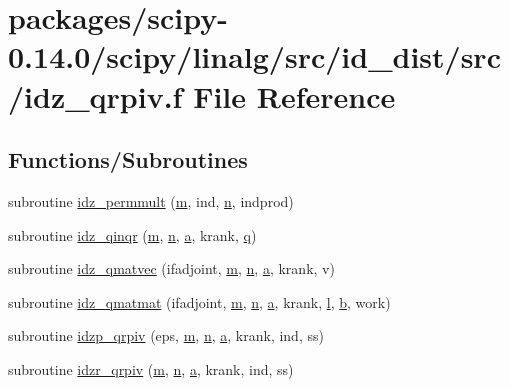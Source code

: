 \hypertarget{idz__qrpiv_8f}{}\section{packages/scipy-\/0.14.0/scipy/linalg/src/id\+\_\+dist/src/idz\+\_\+qrpiv.f File Reference}
\label{idz__qrpiv_8f}
\subsection*{Functions/\+Subroutines}
\begin{DoxyCompactItemize}
\item 
subroutine \hyperlink{idz__qrpiv_8f_ab3e300babf4872d97a265ac09734f7c9}{idz\+\_\+permmult} (\hyperlink{indexexpr_8h_ab72fdb4031d47b75ab26dd18a437bcdc}{m}, ind, \hyperlink{indexexpr_8h_ab427e2e2b4d6cec55fa088ea2a692ace}{n}, indprod)
\item 
subroutine \hyperlink{idz__qrpiv_8f_afd509302dac0cfc5ae5e46c105357ab2}{idz\+\_\+qinqr} (\hyperlink{indexexpr_8h_ab72fdb4031d47b75ab26dd18a437bcdc}{m}, \hyperlink{indexexpr_8h_ab427e2e2b4d6cec55fa088ea2a692ace}{n}, \hyperlink{gen__mat5files_8m_aae328bf20413f220e38aec4d95bfd6da}{a}, krank, \hyperlink{indexexpr_8h_ac886c3584e464b5533390d7440c9dd98}{q})
\item 
subroutine \hyperlink{idz__qrpiv_8f_a6e914f5bb035d5349d8ee04240645f92}{idz\+\_\+qmatvec} (ifadjoint, \hyperlink{indexexpr_8h_ab72fdb4031d47b75ab26dd18a437bcdc}{m}, \hyperlink{indexexpr_8h_ab427e2e2b4d6cec55fa088ea2a692ace}{n}, \hyperlink{gen__mat5files_8m_aae328bf20413f220e38aec4d95bfd6da}{a}, krank, v)
\item 
subroutine \hyperlink{idz__qrpiv_8f_a0893e88e5d3654c0e96b9329e3317bb7}{idz\+\_\+qmatmat} (ifadjoint, \hyperlink{indexexpr_8h_ab72fdb4031d47b75ab26dd18a437bcdc}{m}, \hyperlink{indexexpr_8h_ab427e2e2b4d6cec55fa088ea2a692ace}{n}, \hyperlink{gen__mat5files_8m_aae328bf20413f220e38aec4d95bfd6da}{a}, krank, \hyperlink{indexexpr_8h_a88aacdaa46b76729743ee33ef8b95a58}{l}, \hyperlink{gen__mat5files_8m_a7b38767b3b6a8dae167e5afa4fc340b0}{b}, work)
\item 
subroutine \hyperlink{idz__qrpiv_8f_aa8d5e2dd1378cb02aa99cb28ef888238}{idzp\+\_\+qrpiv} (eps, \hyperlink{indexexpr_8h_ab72fdb4031d47b75ab26dd18a437bcdc}{m}, \hyperlink{indexexpr_8h_ab427e2e2b4d6cec55fa088ea2a692ace}{n}, \hyperlink{gen__mat5files_8m_aae328bf20413f220e38aec4d95bfd6da}{a}, krank, ind, ss)
\item 
subroutine \hyperlink{idz__qrpiv_8f_a53e64c10c9439db12de4bd7c5a75c0c9}{idzr\+\_\+qrpiv} (\hyperlink{indexexpr_8h_ab72fdb4031d47b75ab26dd18a437bcdc}{m}, \hyperlink{indexexpr_8h_ab427e2e2b4d6cec55fa088ea2a692ace}{n}, \hyperlink{gen__mat5files_8m_aae328bf20413f220e38aec4d95bfd6da}{a}, krank, ind, ss)
\end{DoxyCompactItemize}


